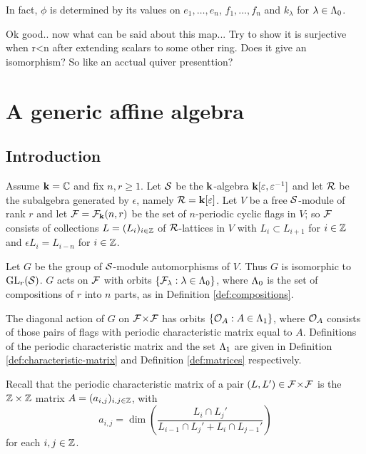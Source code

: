 \documentclass[a4paper, 11pt]{report}
\begin{document}
In fact, $\phi$ is determined by its values on $e_1,\ldots,e_n$, $f_1,\ldots,f_n$ and $k_\lambda$ for $\lambda\in\Lambda_0{}$.


{\color{gray}
Ok good.. now what can be said about this map... Try to show it is surjective when r<n after extending scalars to some other ring. Does it give an isomorphism? So like an acctual quiver presenttion?
}


\chapter{A generic affine algebra}

\section{Introduction}

Assume $\mathbf{k} = \mathbb{C}$ and fix $n,r\geq 1$. Let $\mathcal{S}$ be the $\mathbf{k}$-algebra $\mathbf{k}[\varepsilon,\varepsilon^{-1}]$ and let $\mathcal{R}$ be the subalgebra generated by $\epsilon$, namely $\mathcal{R}=\mathbf{k}[\varepsilon]$. Let $V$ be a free $\mathcal{S}$-module of rank $r$ and let $\mathcal{F} = \mathcal{F}_{\mathbf{k}}(n,r)$ be the set of $n$-periodic cyclic flags in $V$; so $\mathcal{F}$ consists of collections $L = (L_i)_{i\in\mathbb{Z}}$ of $\mathcal{R}$-lattices in $V$ with $L_i\subset L_{i+1}$ for $i\in\mathbb{Z}$ and $\epsilon L_i = L_{i-n}$ for $i\in\mathbb{Z}$.

Let $G$ be the group of $\mathcal{S}$-module automorphisms of $V$. Thus $G$ is isomorphic to $\operatorname{GL}_{r}(\mathcal{S})$. $G$ acts on $\mathcal{F}$ with orbits $\{\mathcal{F}_\lambda:\lambda\in\Lambda_0{}\}$, where $\Lambda_0{}$ is the set of compositions of $r$ into $n$ parts, as in Definition \ref{def:compositions}.

The diagonal action of $G$ on ${\mathcal{F}\!\times\!\mathcal{F}}$ has orbits $\{\mathcal{O}_{A}:A\in\Lambda_1{}\}$, where $\mathcal{O}_{A}$ consists of those pairs of flags with periodic characteristic matrix equal to $A$. Definitions of the periodic characteristic matrix and the set $\Lambda_1{}$ are given in Definition \ref{def:characteristic-matrix} and Definition \ref{def:matrices} respectively.

Recall that the periodic characteristic matrix of a pair $(L,L')\in{\mathcal{F}\!\times\!\mathcal{F}}$ is the $\mathbb{Z}\times\mathbb{Z}$ matrix $A = (a_{i,j})_{i,j\in\mathbb{Z}}$, with
\begin{equation*}
a_{i,j} = \dim\left(\frac{L_i\cap L_j'}{L_{i-1}\cap L_j' + L_i\cap L_{j-1}'}\right)
\end{equation*}
for each $i,j\in\mathbb{Z}$.
\end{document}
